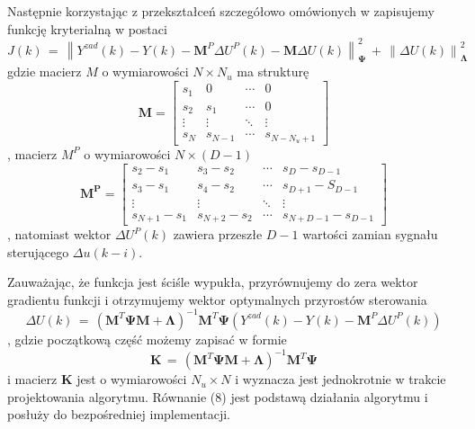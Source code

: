 \par Następnie korzystając z przekształceń szczegółowo omówionych w \cite{stp2009} zapisujemy funkcję kryterialną w postaci
\begin{equation}
J(k) \, = \, \left\| Y^{zad}(k) - Y(k) - \bm{M}^P \Delta U^P(k) - \bm{M} \Delta U(k) \right\|_{\bm{\Psi}}^2 \,+ \,
\left\| \Delta U(k) \right\|_{\bm{\Lambda}}^2
\end{equation}
gdzie macierz \(M \) o wymiarowości \( N \times N_u \) ma strukturę
\begin{equation}
\bm{M} = 
	\begin{bmatrix}
		s_1 & 0 & \cdots & 0 \\
		s_2 & s_1 & \cdots & 0 \\
		\vdots & \vdots & \ddots & \vdots \\
		s_N & s_{N-1} & \cdots & s_{N-N_u+1}
	\end{bmatrix}
\end{equation}, 
macierz \(M^P \) o wymiarowości \( N \times (D-1) \) 
\begin{equation}
\bm{M^P} = 
	\begin{bmatrix}
		s_2 - s_1 & s_3 - s_2 & \cdots & s_D - s_{D-1} \\
		s_3 - s_1 & s_4 - s_2 & \cdots & s_{D+1} - S_{D-1}  \\
		\vdots & \vdots & \ddots & \vdots \\
		s_{N+1} - s_1 & s_{N+2} - s_2 & \cdots & s_{N+D-1} - s_{D-1}
	\end{bmatrix}
\end{equation}, 
natomiast wektor \( \Delta U^P(k) \) zawiera przeszłe \(D-1\) wartości zamian sygnału sterującego \(\Delta u(k-i)\). 

\par Zauważając, że funkcja jest ściśle wypukła, przyrównujemy do zera wektor gradientu funkcji i otrzymujemy wektor optymalnych przyrostów sterowania
\begin{equation}
\Delta U(k) \, = \, (\bm{M}^T\bm{\Psi}\bm{M}+\bm{\Lambda})^{-1}\bm{M}^T\bm{\Psi}(Y^{zad}(k) - Y(k) - \bm{M}^P \Delta U^P(k))
\end{equation}, 
gdzie początkową część możemy zapisać w formie 
\begin{equation}
\bm{K} \, = \, (\bm{M}^T\bm{\Psi}\bm{M}+\bm{\Lambda})^{-1}\bm{M}^T\bm{\Psi}
\end{equation}
i macierz \( \bm{K}\) jest o wymiarowości \( N_u \times N \) i wyznacza jest jednokrotnie w trakcie projektowania algorytmu. Równanie (8) jest podstawą działania algorytmu i posłuży do bezpośredniej implementacji.

